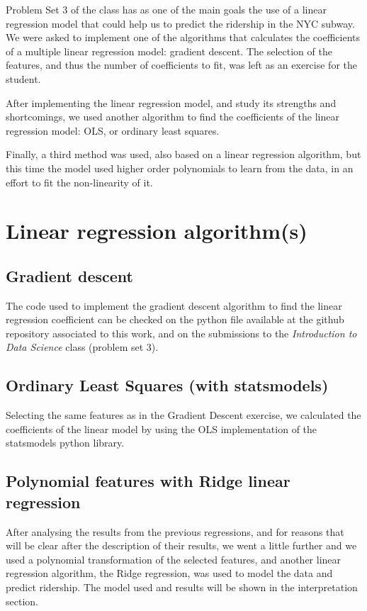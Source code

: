 \documentclass[letterpaper,10pt,english]{sphinxmanual}
\begin{document}
Problem Set 3 of the class has as one of the main goals the use of a linear
regression model that could help us to predict the ridership in the NYC subway.
We were asked to implement one of the algorithms that calculates the coefficients
of a multiple linear regression model: gradient descent. The selection of the
features, and thus the number of coefficients to fit, was left as an exercise
for the student.

After implementing the linear regression model, and study its strengths and
shortcomings, we used another algorithm to find the coefficients of the linear
regression model: OLS, or ordinary least squares.

Finally, a third method was used, also based on a linear regression algorithm,
but this time the model used higher order polynomials to learn from the data,
in an effort to fit the non-linearity of it.


\section{Linear regression algorithm(s)}
\label{section2:linear-regression-algorithm-s}

\subsection{Gradient descent}
\label{section2:gradient-descent}
The code used to implement the gradient descent algorithm to find the linear
regression coefficient can be checked on the python file available at the
github repository associated to this work, and on the submissions to the
\emph{Introduction to Data Science} class (problem set 3).


\subsection{Ordinary Least Squares (with statsmodels)}
\label{section2:ordinary-least-squares-with-statsmodels}
Selecting the same features as in the Gradient Descent exercise, we calculated
the coefficients of the linear model by using the OLS implementation of the
statsmodels python library.


\subsection{Polynomial features with Ridge linear regression}
\label{section2:polynomial-features-with-ridge-linear-regression}
After analysing the results from the previous regressions, and for reasons that
will be clear after the description of their results, we went a little further
and we used a polynomial transformation of the selected features, and another
linear regression algorithm, the Ridge regression, was used to model the data
and predict ridership. The model used and results will be shown in the
interpretation section.
\end{document}
